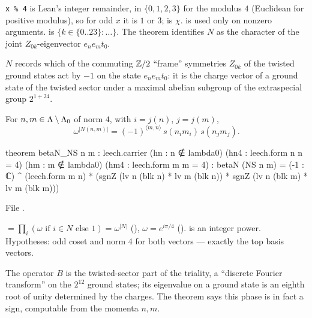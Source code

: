 \begin{dictionary}
\texttt{x \% 4} is Lean's integer remainder, in $\{0,1,2,3\}$ for the modulus $4$ (Euclidean for positive
modulus), so for odd $x$ it is $1$ or $3$;  is $\chi$.   is used only on nonzero
arguments.   is $\{k\in\{0..23\}:\ldots\}$.  The theorem  identifies
$N$ as the character of the joint $Z_{0k}$-eigenvector $e_ne_mt_0$.
\end{dictionary}

\begin{physics}
$N$ records which of the commuting ${\mathbb{Z}}/2$ ``frame'' symmetries $Z_{0k}$ of the twisted ground states act by
$-1$ on the state $e_ne_mt_0$: it is the charge vector of a ground state of the twisted sector under a
maximal abelian subgroup of the extraspecial group $2^{1+24}$.
\end{physics}

\begin{theorem}\label{ch14:thm:betaN}
For $n,m\in{\Lambda}\setminus{\Lambda}_0$ of norm $4$, with $i=j(n)$, $j=j(m)$,
\begin{equation*}
  \omega^{|N(n,m)|}=(-1)^{\langle m,n\rangle}\,s(n_im_i)\,s(n_jm_j).
\end{equation*}
\end{theorem}
\begin{leancode}
theorem betaN_NS {n m : leech.carrier} (hn : n ∉ lambda0) (hn4 : leech.form n n = 4)
    (hm : m ∉ lambda0) (hm4 : leech.form m m = 4) :
    betaN (NS n m) = (-1 : ℂ) ^ (leech.form m n)
      * (sgnZ (lv n (blk n) * lv m (blk n)) * sgnZ (lv n (blk m) * lv m (blk m)))
\end{leancode}
File .

\begin{dictionary}
 $=\prod_i(\omega\text{ if }i\in N\text{ else }1)=\omega^{|N|}$ (), $\omega=e^{i\pi/4}$
().   is an integer power.  Hypotheses: odd coset and norm 4
for both vectors — exactly the top basis vectors.
\end{dictionary}

\begin{physics}
The operator $B$ is the twisted-sector part of the triality, a ``discrete Fourier transform'' on the
$2^{12}$ ground states; its eigenvalue on a ground state is an eighth root of unity determined by the
charges.  The theorem says this phase is in fact a sign, computable from the momenta $n,m$.
\end{physics}

